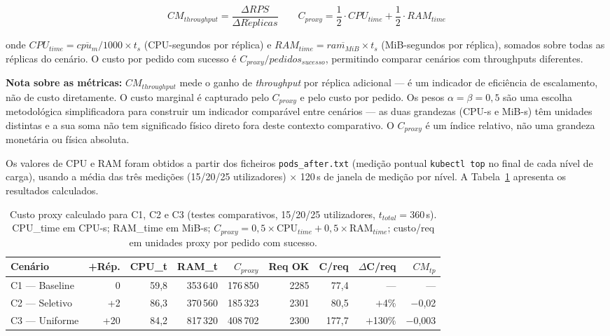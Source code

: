 \documentclass[manuscript,screen,review]{acmart}
\begin{document}
\[
CM_{throughput} = \frac{\Delta RPS}{\Delta R\acute{e}plicas}
\qquad
C_{proxy} = \frac{1}{2} \cdot CPU_{time} + \frac{1}{2} \cdot RAM_{time}
\]

onde $CPU_{time} = \overline{cpu_{m}} / 1000 \times t_{s}$ (CPU-segundos por réplica) e $RAM_{time} = \overline{ram_{MiB}} \times t_{s}$ (MiB-segundos por réplica), somados sobre todas as réplicas do cenário. O custo por pedido com sucesso é $C_{proxy} / pedidos_{sucesso}$, permitindo comparar cenários com throughputs diferentes.

\textbf{Nota sobre as métricas:} $CM_{throughput}$ mede o ganho de \textit{throughput} por réplica adicional — é um indicador de eficiência de escalamento, não de custo diretamente. O custo marginal é capturado pelo $C_{proxy}$ e pelo custo por pedido. Os pesos $\alpha = \beta = 0{,}5$ são uma escolha metodológica simplificadora para construir um indicador comparável entre cenários — as duas grandezas (CPU-s e MiB-s) têm unidades distintas e a sua soma não tem significado físico direto fora deste contexto comparativo. O $C_{proxy}$ é um índice relativo, não uma grandeza monetária ou física absoluta.

Os valores de CPU e RAM foram obtidos a partir dos ficheiros \texttt{pods\_after.txt} (medição pontual \texttt{kubectl top} no final de cada nível de carga), usando a média das três medições (15/20/25 utilizadores) × 120\,s de janela de medição por nível. A Tabela~\ref{tab:custo} apresenta os resultados calculados.

\begin{table}[t]
\caption{Custo proxy calculado para C1, C2 e C3 (testes comparativos, 15/20/25 utilizadores, $t_{total}=360$\,s). CPU\_time em CPU-s; RAM\_time em MiB-s; $C_{proxy} = 0{,}5\times\text{CPU}_{time} + 0{,}5\times\text{RAM}_{time}$; custo/req em unidades proxy por pedido com sucesso.}
\label{tab:custo}
{\footnotesize
\begin{tabular}{lrrrrrrrr}
\toprule
\textbf{Cenário} & \textbf{+Rép.} & \textbf{CPU\_t} & \textbf{RAM\_t} & \textbf{$C_{proxy}$} & \textbf{Req OK} & \textbf{C/req} & \textbf{$\Delta$C/req} & \textbf{$CM_{tp}$} \\
\midrule
C1 — Baseline & 0   & 59{,}8 & 353\,640 & 176\,850 & 2285 & 77{,}4 & — & — \\
C2 — Seletivo & +2  & 86{,}3 & 370\,560 & 185\,323 & 2301 & 80{,}5 & $+$4\%   & $-$0{,}02 \\
C3 — Uniforme & +20 & 84{,}2 & 817\,320 & 408\,702 & 2300 & 177{,}7 & $+$130\% & $-$0{,}003 \\
\bottomrule
\end{tabular}%
}
\end{table}
\end{document}
